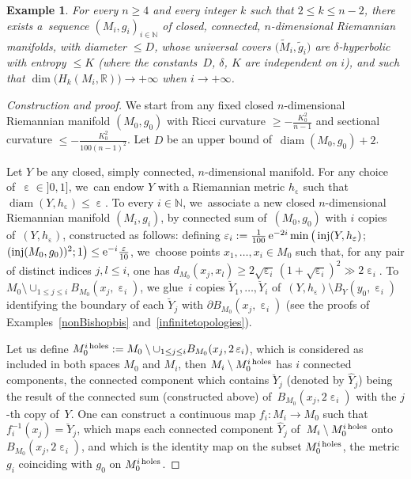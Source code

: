 \documentclass[10pt,a4paper]{amsart}
\numberwithin{equation}{section}
\newtheorem{exa}[theor]{Example}
\newcommand{\N}{\mathbb{N}}
\newcommand{\R}{\mathbb{R}}
\newcommand{\f}{\rightarrow}
\newcommand{\diam}{\operatorname{diam}}
\newcommand{\inj}{\operatorname{inj}}
\newcommand{\e}{\operatorname{\varepsilon}}
\begin{document}
\begin{exa}\label{infiniteBetti}
For every $n \ge 4$ and every integer $k$ such that $ 2 \le k \le n-2$, there exists a~sequence $(M_i, g_i)_{i \in \N}$
of closed, connected, $n$-dimensional Riemannian manifolds, with diameter
$\le D$, whose universal covers $\big(\widetilde M_i, \tilde g_i\big)$ are $\delta$-hyperbolic with entropy $ \le K$ (where the constants~$D$, $\delta$, $K$ are independent on $i$), and such that $\dim \big( H_k (M_i, \R) \big) \f
+ \infty$ when
$i \f +\infty$.
\end{exa}

\begin{proof}[Construction and proof]
We start from any fixed closed $n$-dimensional Riemannian manifold $(M_0,
g_0)$ with Ricci curvature $\ge - \frac{K_0^2}{n-1}$ and
sectional curvature $\le - \frac{K_0^2}{100 (n-1)^2}$. Let $D$ be an upper bound of~$\diam (M_0, g_0) + 2$.

Let $Y$ be any closed, simply connected, $n$-dimensional manifold. For any choice of~$\e \in{} ]0, 1]$, we~can endow $Y$ with a Riemannian metric
$h_{\e}$ such that
$\diam (Y, h_{\e}) \le \e$. To every $i \in \N$, we~associate a new closed $n$-dimensional Riemannian manifold $(M_i, g_i)$, by connected sum of~$(M_0, g_0)$ with $i$ copies of~$(Y, h_{\e})$, constructed as follows: defining $\e_i := \frac{1}{100}\, {\rm e}^{- 2 i } \min \big( \inj (Y, h_{\e})$;
$(\inj (M_0, g_0))^2; 1 \big) \le {\rm e}^{-i } \frac{\e}{10}$, we~choose points $x_1, \dots, x_i \in M_0$ such that, for any pair of distinct indices $j,
l \le i$, one has
$d_{M_0} (x_j, x_l) \ge 2 \sqrt{\e_i} \, (1 + \sqrt{\e_i})^2 \gg 2 \e_i$. To $ M_0 \setminus \cup_{1 \le j \le i} B_{M_0} (x_j, \e_i)$, we glue~$i$ copies
$\breve Y_1, \dots, \breve Y_i$ of~$(Y, h_{\e}) \setminus B_{Y} (y_0, \e_i)$ identifying the boundary of each $\breve Y_j$ with $\partial B_{M_0} (x_j, \e_i)$ (see the proofs of Examples~\ref{nonBishopbis} and~\ref{infinitetopologies}).

Let us define $M_0^{i {\rm \, holes}}:= M_0 \setminus \cup_{1 \le j \le
i} B_{M_0} (x_j, 2 \e_i)$, which is considered as included in both spaces $M_0$
and $M_i$, then $M_i \setminus M_0^{i {\rm \, holes}} $ has $i$ connected
components, the connected component which contains $\breve Y_j $ (denoted
by $\widehat Y_j$) being the result of the connected sum (constructed above) of~$ B_{M_0} (x_j, 2 \e_i)$ with the $j$-th copy of~$Y$.
One can construct a continuous map $f_i \colon M_i \f M_0$ such that $f_i^{-1} (x_j) = \breve Y_j $, which maps each connected component $\widehat Y_j$
of~$M_i \setminus M_0^{i {\rm \, holes}}$ onto $B_{M_0} (x_j, 2 \e_i)$,
and which is the identity map on the subset $M_0^{i {\rm \, holes}}$, the
metric $g_i$ coinciding with $g_0$ on $M_0^{i {\rm \, holes}}$.


\end{proof}
\end{document}
